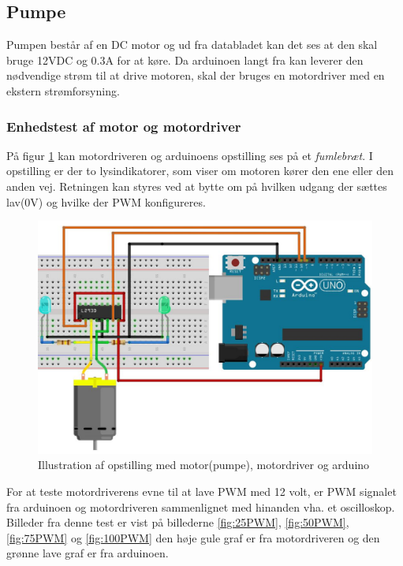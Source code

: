 \subsection{Pumpe}
 Pumpen består af en DC motor og ud fra databladet kan det ses at den skal bruge 12VDC og 0.3A for at køre. Da arduinoen langt fra kan leverer den nødvendige strøm til at drive motoren, skal der bruges en motordriver med en ekstern strømforsyning.
 

\subsubsection{Enhedstest af motor og motordriver}
\label{subsubsec:enhedstestmotor}
På figur \ref{fig:Motorbreadboard} kan motordriveren og arduinoens opstilling ses på et \textit{fumlebræt}. I opstilling er der to lysindikatorer, som viser om motoren kører den ene eller den anden vej. Retningen kan styres ved at bytte om på hvilken udgang der sættes lav(0V) og hvilke der PWM konfigureres.
 

 \begin{figure}[H]
	\centering
	\includegraphics[width=1\textwidth]{billeder/Hardware/diagrammer/Motorbreadboard.JPG}
	\caption{Illustration af opstilling med motor(pumpe), motordriver og arduino}
	\label{fig:Motorbreadboard}
\end{figure}

For at teste motordriverens evne til at lave PWM med 12 volt, er PWM signalet fra arduinoen og motordriveren sammenlignet med hinanden vha. et oscilloskop. Billeder fra denne test er vist på  billederne \ref{fig:25PWM}, \ref{fig:50PWM}, \ref{fig:75PWM} og \ref{fig:100PWM} den høje gule graf er fra motordriveren og den grønne lave graf er fra arduinoen.

